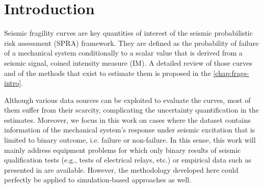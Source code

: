 \minitoc

\section{Introduction}


Seismic fragility curves are key quantities of interest of the seismic probabilistic risk assessment (SPRA) framework.
They are defined as the probability of failure of a mechanical system conditionally to a scalar value that is derived from a seismic signal, coined intensity measure (IM).
A detailed review of those curves and of the methods that exist to estimate them is proposed in the \cref{chap:frags-intro}.

Although various data sources can be exploited to evaluate the curves, most of them  suffer from their scarcity,
complicating the uncertainty quantification in the estimates.
Moreover, we focus in this work on cases where the dataset contains information of the mechanical system's response under seismic excitation that is limited to binary outcome, i.e. failure or non-failure.
In this sense, this work will mainly address equipment problems for which only binary results of seismic qualification tests (e.g., tests of electrical relays, etc.) or empirical data such as presented in \cite{straub_improved_2008} are available. However, the methodology developed here could perfectly be applied to simulation-based approaches as well.



